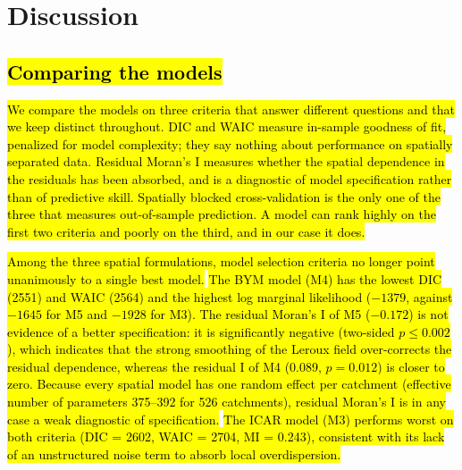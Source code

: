 \documentclass[journal abbreviation, manuscript]{copernicus}
\newcommand{\hlE}[1]{{\sethlcolor{edcyan}\hl{#1}}}
\begin{document}

\section{Discussion}\label{sec5}

\subsection{\hlE{Comparing the models}}\label{subsec51}

\hlE{We compare the models on three criteria that answer different questions and that we keep distinct throughout. DIC and WAIC measure in-sample goodness of fit, penalized for model complexity; they say nothing about performance on spatially separated data. Residual Moran's I measures whether the spatial dependence in the residuals has been absorbed, and is a diagnostic of model specification rather than of predictive skill. Spatially blocked cross-validation is the only one of the three that measures out-of-sample prediction. A model can rank highly on the first two criteria and poorly on the third, and in our case it does.}

\hl{Among the three spatial formulations, model selection criteria no longer point unanimously to a single best model. 
} \hlE{The BYM model (M4) has the lowest DIC (2551) and WAIC (2564) and the highest log marginal likelihood ($-1379$, against $-1645$ for M5 and $-1928$ for M3). The residual Moran's I of M5 ($-0.172$) is not evidence of a better specification: it is significantly negative (two-sided $p \leq 0.002$), which indicates that the strong smoothing of the Leroux field over-corrects the residual dependence, whereas the residual I of M4 (0.089, $p = 0.012$) is closer to zero. Because every spatial model has one random effect per catchment (effective number of parameters 375--392 for 526 catchments), residual Moran's I is in any case a weak diagnostic of specification.} \hl{The ICAR model (M3) performs worst on both criteria (DIC = 2602, WAIC = 2704, MI = 0.243), consistent with its lack of an unstructured noise term to absorb local overdispersion.}
\end{document}
